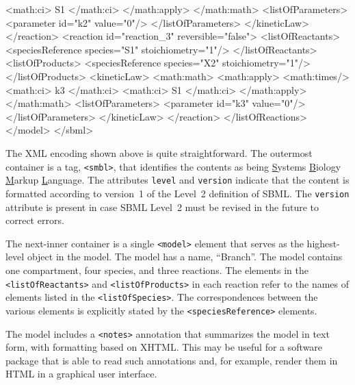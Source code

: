 \documentclass[10pt,twocolumntoc]{cekarticle}
\begin{document}
\begin{example}
                            <math:ci> S1 </math:ci>
                        </math:apply>
                    </math:math>
                    <listOfParameters>
                        <parameter id="k2" value="0"/>
                    </listOfParameters>
                </kineticLaw>
            </reaction>
            <reaction id="reaction_3" reversible="false">
                <listOfReactants>
                    <speciesReference species="S1" stoichiometry="1"/>
                </listOfReactants>
                <listOfProducts>
                    <speciesReference species="X2" stoichiometry="1"/>
                </listOfProducts>
                <kineticLaw>
                    <math:math>
                        <math:apply>
                            <math:times/>
                            <math:ci> k3 </math:ci>
                            <math:ci> S1 </math:ci>
                        </math:apply>
                    </math:math>
                    <listOfParameters>
                        <parameter id="k3" value="0"/>
                    </listOfParameters>
                </kineticLaw>
            </reaction>
        </listOfReactions>
    </model>
</sbml>
\end{example}

The XML encoding shown above is quite straightforward. The
outermost container is a tag, \texttt{<smbl>}, that identifies the
contents as being \underline{S}ystems \underline{B}iology
\underline{M}arkup \underline{L}anguage.  The attributes
\texttt{level} and \texttt{version} indicate that the content is
formatted according to version~1 of the Level~2 definition of
SBML. The \texttt{version} attribute is present in case SBML
Level~2 must be revised in the future to correct errors.

The next-inner container is a single \texttt{<model>} element that
serves as the highest-level object in the model.  The model has a
name, ``Branch''. The model contains one compartment, four
species, and three reactions.  The elements in the
\texttt{<listOfReactants>} and \texttt{<listOfProducts>} in each
reaction refer to the names of elements listed in the
\texttt{<listOfSpecies>}.  The correspondences between the various
elements is explicitly stated by the \texttt{<speciesReference>}
elements.

The model includes a \texttt{<notes>} annotation that summarizes the model
in text form, with formatting based on XHTML.  This may be useful for a
software package that is able to read such annotations and, for example,
render them in HTML in a graphical user interface.
\end{document}
